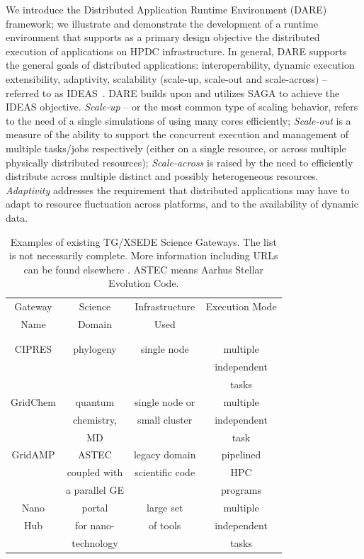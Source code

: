 \documentclass[]{svjour3}
\begin{document}

We introduce the Distributed Application Runtime Environment (DARE)
framework; we illustrate and demonstrate the development of a runtime
environment that supports as a primary design objective the
distributed execution of applications on HPDC infrastructure.  In
general, DARE supports the general goals of distributed applications:
interoperability, dynamic execution %
extensibility, adaptivity, scalability (scale-up, scale-out and
scale-across) -- referred to as IDEAS~\cite{ideas}.  DARE builds upon
and utilizes SAGA to achieve the IDEAS objective.  {\it Scale-up} --
or the most common type of scaling behavior, refers to the need of a
single simulations of using many cores efficiently; {\it Scale-out} is
a measure of the ability to support the concurrent execution and
management of multiple tasks/jobs respectively (either on a single
resource, or across multiple physically distributed resources); {\it
  Scale-across} is raised by the need to efficiently distribute across
multiple distinct and possibly heterogeneous resources. {\it
  Adaptivity} addresses the requirement that distributed applications
may have to adapt to resource fluctuation across platforms, and to the
availability of dynamic data.

\begin{table}
\centering
 \small
\begin{tabular}{|c|c|c|c|} 
  \hline Gateway  & Science & Infrastructure & Execution Mode 
  \\
  Name & Domain & Used & \\ 
  &  &  & \\
  & & & \\  \hline \hline 
  
  CIPRES   & phylogeny  &  single node  & multiple  \\
   &  &   & independent   \\ 
  &  &  &  tasks \\  \hline
  GridChem   & quantum & single node or     & multiple  \\
     & chemistry, & small cluster & independent   \\
  & MD &  & task  \\ \hline
   GridAMP     & ASTEC  & legacy domain  & pipelined \\ 
  & coupled with  &  scientific code   & HPC  \\
  & a parallel GE &   &  programs \\ \hline
  Nano  & portal  & large set   & multiple \\
  Hub  & for nano- & of tools  & independent \\
   & technology &  & tasks \\ \hline
  \hline
\end{tabular} \caption{Examples of existing TG/XSEDE Science Gateways. The list is not necessarily complete. More information including URLs can be found elsewhere \cite{tg-sg-list-url}. ASTEC means Aarhus Stellar Evolution Code.}
 \label{table:TG-sg} 
\end{table}
\end{document}
